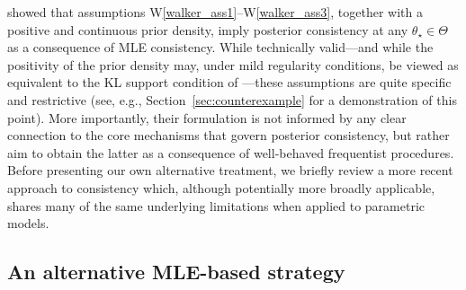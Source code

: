 \documentclass[11pt,twoside]{article}
\newcommand{\Wref}[1]{W\ref{#1}}
\begin{document}
\cite{walker1969} showed that assumptions \Wref{walker_ass1}--\Wref{walker_ass3}, together with a positive and continuous prior density, imply posterior consistency at any $\theta_\star \in \Theta$ as a consequence of MLE consistency. While technically valid—and while the positivity of the prior density may, under mild regularity conditions, be viewed as equivalent to the KL support condition of \cite{schwartz1964consistency}—these assumptions are quite specific and restrictive (see, e.g., Section~\ref{sec:counterexample} for a demonstration of this point). More importantly, their formulation is not informed by any clear connection to the core mechanisms that govern posterior consistency, but rather aim to obtain the latter as a consequence of well-behaved frequentist procedures. Before presenting our own alternative treatment, we briefly review a more recent approach to consistency which, although potentially more broadly applicable, shares many of the same underlying limitations when applied to parametric models.


\subsection{An alternative MLE-based strategy}
\end{document}
